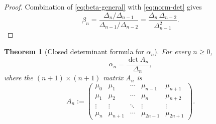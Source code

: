 \documentclass[11pt]{amsart}
\numberwithin{equation}{section}
\newtheorem{theorem}{Theorem}[section]
\theoremstyle{definition}
\newcommand{\mom}[1]{\mu_{#1}}
\newcommand{\DeltaH}[1]{\Delta_{#1}}
\begin{document}
\begin{proof}
Combination of \eqref{eq:beta-general} with \eqref{eq:norm-det} gives
\[
\beta_{n}
=\frac{\DeltaH{n}/\DeltaH{n-1}}{\DeltaH{n-1}/\DeltaH{n-2}}
=\frac{\DeltaH{n}\,\DeltaH{n-2}}{\DeltaH{n-1}^{2}}.
\]
\end{proof}

\begin{theorem}[Closed determinant formula for $\alpha_{n}$]\label{thm:alpha-det}
For every $n\ge 0$,
\begin{equation}\label{eq:alpha-det}
\alpha_{n}
=\frac{\det A_{n}}{\DeltaH{n}},
\end{equation}
where the $(n+1)\times(n+1)$ matrix $A_{n}$ is
\begin{equation}\label{eq:An-def}
A_{n}
:=
\begin{pmatrix}
\mom{0} & \mom{1} & \cdots & \mom{n-1} & \mom{n+1}\\
\mom{1} & \mom{2} & \cdots & \mom{n} & \mom{n+2}\\
\vdots  & \vdots  & \ddots & \vdots  & \vdots\\
\mom{n} & \mom{n+1} & \cdots & \mom{2n-1} & \mom{2n+1}
\end{pmatrix}.
\end{equation}
\end{theorem}
\end{document}
